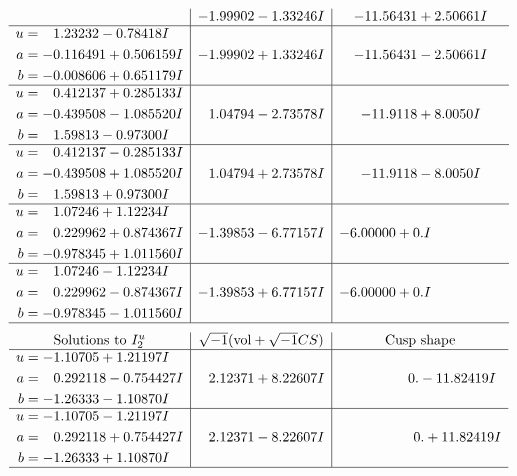 \documentclass[1p]{elsarticle_modified}
\theoremstyle{definition}
\newcommand{\I}{\sqrt{-1}}
\begin{document}
$$\begin{array}{c|c|c}
 & -1.99902 - 1.33246 I & -11.56431 + 2.50661 I \\ \hline\begin{aligned}
u &= \phantom{-}1.23232 - 0.78418 I \\
a &= -0.116491 + 0.506159 I \\
b &= -0.008606 + 0.651179 I\end{aligned}
 & -1.99902 + 1.33246 I & -11.56431 - 2.50661 I \\ \hline\begin{aligned}
u &= \phantom{-}0.412137 + 0.285133 I \\
a &= -0.439508 - 1.085520 I \\
b &= \phantom{-}1.59813 - 0.97300 I\end{aligned}
 & \phantom{-}1.04794 - 2.73578 I & -11.9118 + 8.0050 I \\ \hline\begin{aligned}
u &= \phantom{-}0.412137 - 0.285133 I \\
a &= -0.439508 + 1.085520 I \\
b &= \phantom{-}1.59813 + 0.97300 I\end{aligned}
 & \phantom{-}1.04794 + 2.73578 I & -11.9118 - 8.0050 I \\ \hline\begin{aligned}
u &= \phantom{-}1.07246 + 1.12234 I \\
a &= \phantom{-}0.229962 + 0.874367 I \\
b &= -0.978345 + 1.011560 I\end{aligned}
 & -1.39853 - 6.77157 I & -6.00000 + 0. I\phantom{ +0.000000I} \\ \hline\begin{aligned}
u &= \phantom{-}1.07246 - 1.12234 I \\
a &= \phantom{-}0.229962 - 0.874367 I \\
b &= -0.978345 - 1.011560 I\end{aligned}
 & -1.39853 + 6.77157 I & -6.00000 + 0. I\phantom{ +0.000000I}\\
 \hline 
 \end{array}$$\newpage$$\begin{array}{c|c|c}  
\text{Solutions to }I^u_{2}& \I (\text{vol} + \sqrt{-1}CS) & \text{Cusp shape}\\
 \hline 
\begin{aligned}
u &= -1.10705 + 1.21197 I \\
a &= \phantom{-}0.292118 - 0.754427 I \\
b &= -1.26333 - 1.10870 I\end{aligned}
 & \phantom{-}2.12371 + 8.22607 I & \phantom{-0.000000 } 0. - 11.82419 I \\ \hline\begin{aligned}
u &= -1.10705 - 1.21197 I \\
a &= \phantom{-}0.292118 + 0.754427 I \\
b &= -1.26333 + 1.10870 I\end{aligned}
 & \phantom{-}2.12371 - 8.22607 I & \phantom{-0.000000 -}0. + 11.82419 I\\
 \hline 
 \end{array}$$\newpage
\end{document}
